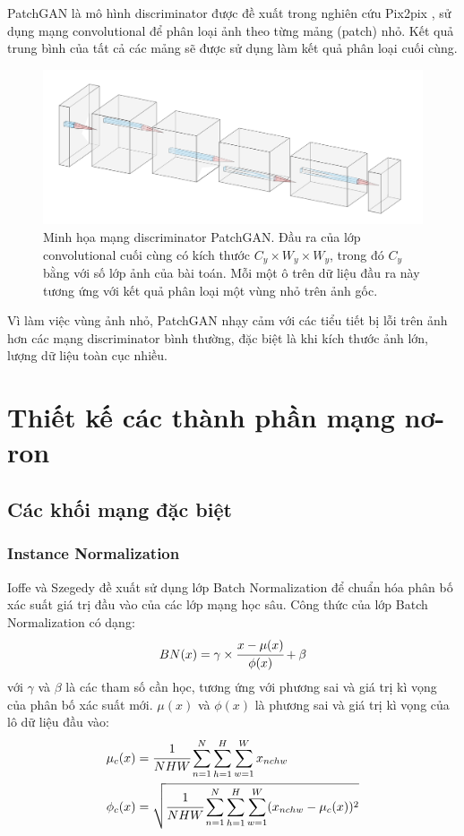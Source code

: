\documentclass[12pt]{extreport}
\begin{document}
PatchGAN là mô hình discriminator được đề xuất trong nghiên cứu Pix2pix \cite{pix2pix2017}, sử dụng mạng convolutional để phân loại ảnh theo từng mảng (patch) nhỏ. Kết quả trung bình của tất cả các mảng sẽ được sử dụng làm kết quả phân loại cuối cùng.

\begin{figure}[H]
    \centering
    \includegraphics[width=\linewidth]{figure37.png}
    \caption{Minh họa mạng discriminator PatchGAN. Đầu ra của lớp convolutional cuối cùng có kích thước $ C_y \times W_y \times W_y $, trong đó $ C_y $ bằng với số lớp ảnh của bài toán. Mỗi một ô trên dữ liệu đầu ra này tương ứng với kết quả phân loại một vùng nhỏ trên ảnh gốc.}
\end{figure}

Vì làm việc vùng ảnh nhỏ, PatchGAN nhạy cảm với các tiểu tiết bị lỗi trên ảnh hơn các mạng discriminator bình thường, đặc biệt là khi kích thước ảnh lớn, lượng dữ liệu toàn cục nhiều.

\section{Thiết kế các thành phần mạng nơ-ron}

\subsection{Các khối mạng đặc biệt}

\subsubsection{Instance Normalization}

Ioffe và Szegedy đề xuất sử dụng lớp Batch Normalization \cite{DBLP:journals/corr/IoffeS15} để chuẩn hóa phân bố xác suất giá trị đầu vào của các lớp mạng học sâu. Công thức của lớp Batch Normalization có dạng:
$$ BN(x) = \gamma \times \cfrac{x - \mu(x)}{\phi(x)} + \beta $$
với $ \gamma $ và $ \beta $ là các tham số cần học, tương ứng với phương sai và giá trị kì vọng của phân bố xác suất mới. $ \mu(x) $ và $ \phi(x) $ là phương sai và giá trị kì vọng của lô dữ liệu đầu vào:
\begin{align*}
    \mu_c(x)  & = \cfrac{1}{NHW} \sum_{n = 1}^{N} \sum_{h = 1}^{H} \sum_{w = 1}^{W} x_{nchw}                       \\
    \phi_c(x) & = \sqrt{\cfrac{1}{NHW} \sum_{n = 1}^{N} \sum_{h = 1}^{H} \sum_{w = 1}^{W} (x_{nchw} - \mu_c(x))^2}
\end{align*}
\end{document}
